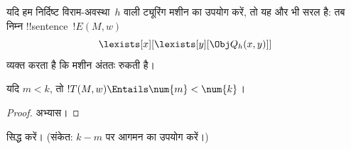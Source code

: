 \documentclass[../../../include/open-logic-section]{subfiles}
\begin{document}
यदि हम निर्दिष्ट विराम-अवस्था~$h$ वाली ट्यूरिंग मशीन का उपयोग करें, तो
यह और भी सरल है: तब निम्न !!{sentence}~$!E(M, w)$
\[
\lexists[x][\lexists[y][\Obj Q_h(x, y)]]
\]
व्यक्त करता है कि मशीन अंततः रुकती है।

\begin{prop}
यदि $m < k$, तो $!T(M, w) \Entails \num{m} < \num{k}$।
\end{prop}

\begin{proof}
अभ्यास।
\end{proof}

\begin{prob}
 सिद्ध करें।
(संकेत: $k-m$ पर आगमन का उपयोग करें।)
\end{prob}
\end{document}
